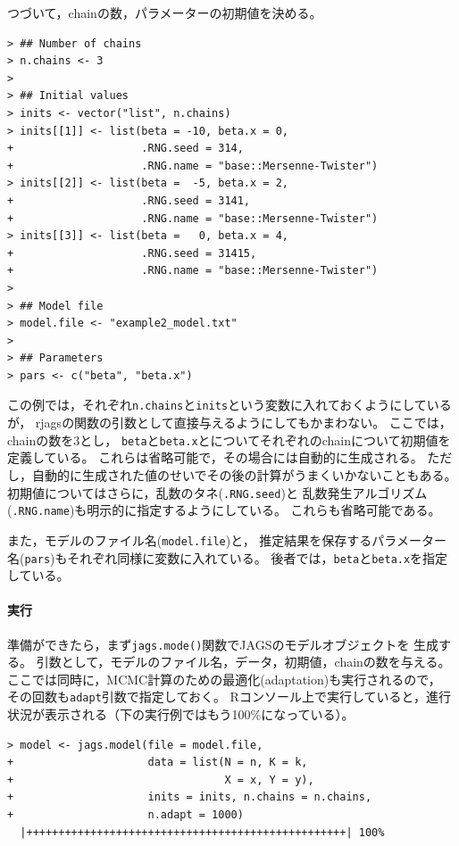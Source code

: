 \documentclass[11pt,uplatex]{jsarticle}
\begin{document}
つづいて，chainの数，パラメーターの初期値を決める。

\begin{lstlisting}
> ## Number of chains
> n.chains <- 3
> 
> ## Initial values
> inits <- vector("list", n.chains)
> inits[[1]] <- list(beta = -10, beta.x = 0,
+                    .RNG.seed = 314,
+                    .RNG.name = "base::Mersenne-Twister")
> inits[[2]] <- list(beta =  -5, beta.x = 2,
+                    .RNG.seed = 3141,
+                    .RNG.name = "base::Mersenne-Twister")
> inits[[3]] <- list(beta =   0, beta.x = 4,
+                    .RNG.seed = 31415,
+                    .RNG.name = "base::Mersenne-Twister")
> 
> ## Model file
> model.file <- "example2_model.txt"
> 
> ## Parameters
> pars <- c("beta", "beta.x")
\end{lstlisting}

この例では，それぞれ\texttt{n.chains}と\texttt{inits}という変数に入れておくようにしているが，
\textsf{rjags}の関数の引数として直接与えるようにしてもかまわない。
ここでは，chainの数を3とし，
\texttt{beta}と\texttt{beta.x}とについてそれぞれのchainについて初期値を
定義している。
これらは省略可能で，その場合には自動的に生成される。
ただし，自動的に生成された値のせいでその後の計算がうまくいかないこともある。
初期値についてはさらに，乱数のタネ(\texttt{.RNG.seed})と
乱数発生アルゴリズム(\texttt{.RNG.name})も明示的に指定するようにしている。
これらも省略可能である。

また，モデルのファイル名(\texttt{model.file})と，
推定結果を保存するパラメーター名(\texttt{pars})もそれぞれ同様に変数に入れている。
後者では，\texttt{beta}と\texttt{beta.x}を指定している。


\paragraph{実行}

準備ができたら，まず\texttt{jags.mode()}関数でJAGSのモデルオブジェクトを
生成する。
引数として，モデルのファイル名，データ，初期値，chainの数を与える。
ここでは同時に，MCMC計算のための最適化(adaptation)も実行されるので，
その回数も\texttt{adapt}引数で指定しておく。
Rコンソール上で実行していると，進行状況が表示される（下の実行例ではもう100\%になっている）。

\begin{lstlisting}
> model <- jags.model(file = model.file,
+                     data = list(N = n, K = k,
+                                 X = x, Y = y),
+                     inits = inits, n.chains = n.chains,
+                     n.adapt = 1000)
  |++++++++++++++++++++++++++++++++++++++++++++++++++| 100%
\end{lstlisting}
\end{document}
